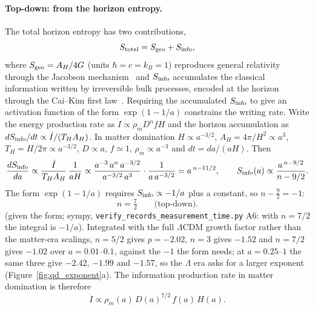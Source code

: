 \paragraph{Top-down: from the horizon entropy.} The total horizon entropy has two contributions,
\begin{equation}
S_{\rm total}=S_{\rm geo}+S_{\rm info},\label{eq:qr_Stot}
\end{equation}
where $S_{\rm geo}=A_H/4G$ (units $\hbar=c=k_B=1$) reproduces general relativity through the Jacobson mechanism~\cite{Jacobson1995} and $S_{\rm info}$
accumulates the classical information written by irreversible bulk processes, encoded at the horizon through the Cai--Kim first law~\cite{CaiKim2005}.
\interp{} Requiring the accumulated $S_{\rm info}$ to give an activation function of the form $\exp(1-1/a)$ constrains the writing rate.
Write the energy production rate as $\dot I\propto\rho_mD^nfH$ and the horizon accumulation as $dS_{\rm info}/dt\propto\dot I/(T_HA_H)$. In matter domination
$H\propto a^{-3/2}$, $A_H=4\pi/H^2\propto a^3$, $T_H=H/2\pi\propto a^{-3/2}$, $D\propto a$, $f\simeq1$, $\rho_m\propto a^{-3}$ and $dt=da/(aH)$. Then
\begin{equation}
\frac{dS_{\rm info}}{da}\propto\frac{\dot I}{T_HA_H}\,\frac{1}{aH}\propto\frac{a^{-3}\,a^n\,a^{-3/2}}{a^{-3/2}\,a^{3}}\cdot\frac{1}{a\,a^{-3/2}}=a^{\,n-11/2},
\qquad S_{\rm info}(a)\propto\frac{a^{\,n-9/2}}{n-9/2}.\label{eq:qr_Sinfo}
\end{equation}
The form $\exp(1-1/a)$ requires $S_{\rm info}\propto-1/a$ plus a constant, so $n-\tfrac92=-1$:
\begin{equation}n=\tfrac72\qquad\text{(top-down).}\label{eq:qr_n72}\end{equation}
\derived{} (given the form; sympy, \texttt{verify\_records\_measurement\_time.py} A6: with $n=7/2$ the integral is $-1/a$). Integrated with the full $\Lambda$CDM growth factor rather than the matter-era scalings,
$n=5/2$ gives $p=-2.02$, $n=3$ gives $-1.52$ and $n=7/2$ gives $-1.02$ over $a=0.01$--$0.1$, against the $-1$ the form needs; at $a=0.25$--$1$ the same
three give $-2.42$, $-1.99$ and $-1.57$, so the $\Lambda$ era asks for a larger exponent (Figure~\ref{fig:qd_exponent}a). \calc{} The information
production rate in matter domination is therefore
\begin{equation}
\dot I\propto\rho_m(a)\,D(a)^{7/2}\,f(a)\,H(a).\label{eq:qr_Idot}
\end{equation}

